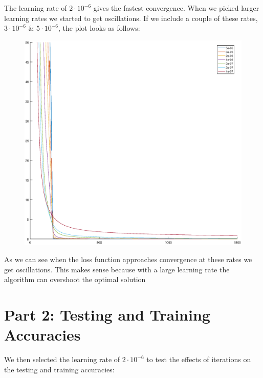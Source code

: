 \documentclass{article}
\begin{document}
	The learning rate of $2 \cdot 10^{-6}$ gives the fastest convergence. When we picked larger learning rates we started to get oscillations. If we include a couple of these rates, $3 \cdot 10^{-6}$ \& $5 \cdot 10^{-6}$, the plot looks as follows:
	
	\newpage
	
	\begin{figure}[h!]
		\begin{center} 
			\includegraphics[scale=0.4]{learn_rates_jitter.eps} 
		\end{center} 
		\label{fig:M2}
	\end{figure}
	
	As we can see when the loss function approaches convergence at these rates we get oscillations. This makes sense because with a large learning rate the algorithm can overshoot the optimal solution
	
	\section*{Part 2: Testing and Training Accuracies}
	
	We then selected the learning rate of $2 \cdot 10^{-6}$ to test the effects of iterations on the testing and training accuracies:
	\newpage
	
\end{document}

